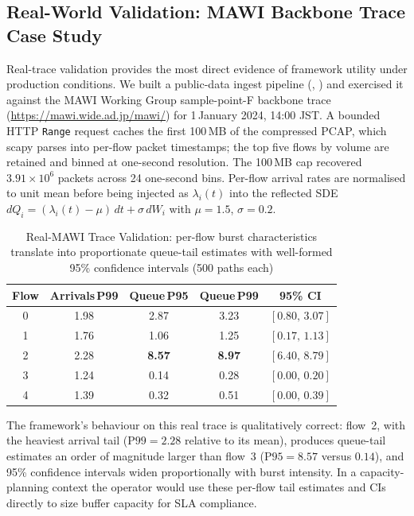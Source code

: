 \documentclass[pdflatex,sn-mathphys-num]{sn-jnl}
\theoremstyle{thmstyleone}%
\theoremstyle{thmstyletwo}%
\theoremstyle{thmstylethree}%
\begin{document}
\subsection{Real-World Validation: MAWI Backbone Trace Case Study}
\label{subsec:mawi_validation}

Real-trace validation provides the most direct evidence of framework utility under production conditions.
We built a public-data ingest pipeline (,
) and exercised it against the MAWI Working Group
sample-point-F backbone trace (\url{https://mawi.wide.ad.jp/mawi/}) for 1\,January 2024,
14:00 JST. A bounded HTTP \texttt{Range} request caches the first 100\,MB of the compressed
PCAP, which scapy parses into per-flow packet timestamps; the top five flows by volume are
retained and binned at one-second resolution. The 100\,MB cap recovered $3.91\times10^{6}$
packets across 24 one-second bins. Per-flow arrival rates are normalised to unit mean before
being injected as $\lambda_i(t)$ into the reflected SDE
$dQ_i = (\lambda_i(t)-\mu)\,dt + \sigma\,dW_i$ with $\mu=1.5$, $\sigma=0.2$.

\begin{table}[!t]
\caption{Real-MAWI Trace Validation: per-flow burst characteristics translate into proportionate
queue-tail estimates with well-formed 95\% confidence intervals (500 paths each)}
\label{tab:mawi_validation}
\centering
\begin{tabular}{@{}c c c c c@{}}
\toprule
Flow & Arrivals\,P99 & Queue\,P95 & Queue\,P99 & 95\% CI \\
\midrule
0 & 1.98 & 2.87 & 3.23 & $[0.80,\,3.07]$ \\
1 & 1.76 & 1.06 & 1.25 & $[0.17,\,1.13]$ \\
2 & 2.28 & \textbf{8.57} & \textbf{8.97} & $[6.40,\,8.79]$ \\
3 & 1.24 & 0.14 & 0.28 & $[0.00,\,0.20]$ \\
4 & 1.39 & 0.32 & 0.51 & $[0.00,\,0.39]$ \\
\bottomrule
\end{tabular}
\end{table}

The framework's behaviour on this real trace is qualitatively correct: flow~2, with the heaviest
arrival tail ($\mathrm{P99}=2.28$ relative to its mean), produces queue-tail estimates an order
of magnitude larger than flow~3 ($\mathrm{P95}=8.57$ versus $0.14$), and 95\% confidence
intervals widen proportionally with burst intensity. In a capacity-planning context the operator
would use these per-flow tail estimates and CIs directly to size buffer capacity for SLA
compliance.
\end{document}
